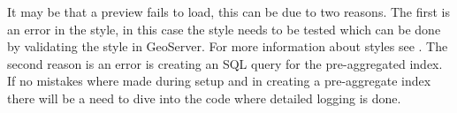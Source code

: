 It may be that a preview fails to load, this can be due to two reasons. The
first is an error in the style, in this case the style needs to be tested
which can be done by validating the style in GeoServer. For more
information about styles see . The second reason is
an error is creating an SQL query for the pre-aggregated index. If no
mistakes where made during setup and in creating a pre-aggregate index
there will be a need to dive into the code where detailed logging is done.


